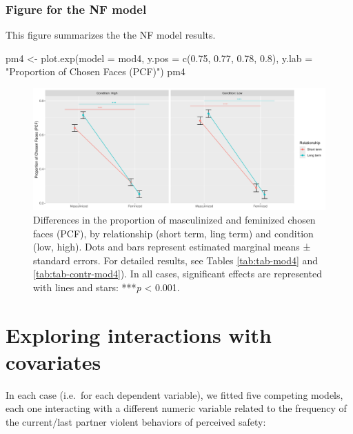 \documentclass[
  bookmarksnumbered]{article}
\newenvironment{Shaded}{\begin{snugshade}}{\end{snugshade}}
\newcommand{\AttributeTok}[1]{\textcolor[rgb]{0.80,0.80,0.80}{#1}}
\newcommand{\FloatTok}[1]{\textcolor[rgb]{0.75,0.75,0.82}{#1}}
\newcommand{\FunctionTok}[1]{\textcolor[rgb]{0.94,0.94,0.56}{#1}}
\newcommand{\NormalTok}[1]{\textcolor[rgb]{0.80,0.80,0.80}{#1}}
\newcommand{\OtherTok}[1]{\textcolor[rgb]{0.94,0.94,0.56}{#1}}
\newcommand{\StringTok}[1]{\textcolor[rgb]{0.80,0.58,0.58}{#1}}
\begin{document}
\subsubsection{Figure for the NF model}\label{figure-for-the-nf-model-1}

This figure summarizes the the NF model results.

\begin{Shaded}
\begin{Highlighting}[]
\NormalTok{pm4 }\OtherTok{\textless{}{-}} \FunctionTok{plot.exp}\NormalTok{(}\AttributeTok{model =}\NormalTok{ mod4, }
                \AttributeTok{y.pos =} \FunctionTok{c}\NormalTok{(}\FloatTok{0.75}\NormalTok{, }\FloatTok{0.77}\NormalTok{, }\FloatTok{0.78}\NormalTok{, }\FloatTok{0.8}\NormalTok{),}
                \AttributeTok{y.lab =} \StringTok{"Proportion of Chosen Faces (PCF)"}\NormalTok{)}
\NormalTok{pm4}
\end{Highlighting}
\end{Shaded}

\begin{figure}
\centering
\includegraphics{Supplementary_material_files/figure-latex/fig-mod4-1.pdf}
\caption{\label{fig:fig-mod4}Differences in the proportion of masculinized and feminized chosen faces (PCF), by relationship (short term, ling term) and condition (low, high). Dots and bars represent estimated marginal means ± standard errors. For detailed results, see Tables \ref{tab:tab-mod4} and \ref{tab:tab-contr-mod4}). In all cases, significant effects are represented with lines and stars: ***\emph{p} \textless{} 0.001.}
\end{figure}

\section{Exploring interactions with covariates}\label{exploring-interactions-with-covariates}

In each case (i.e.~for each dependent variable), we fitted five competing models, each one interacting with a different numeric variable related to the frequency of the current/last partner violent behaviors of perceived safety:
\end{document}
